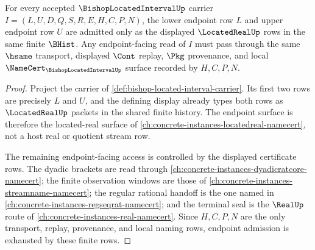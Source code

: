 \begin{theorem}
\label{thm:bishop-located-interval-endpoint-admission}
For every accepted $\BishopLocatedIntervalUp$ carrier $I=(L,U,D,Q,S,R,E,H,C,P,N)$, the lower endpoint row $L$ and upper endpoint row $U$ are admitted only as the displayed $\LocatedRealUp$ rows in the same finite $\BHist$. Any endpoint-facing read of $I$ must pass through the same $\hsame$ transport, displayed $\Cont$ replay, $\Pkg$ provenance, and local $\NameCert_{\BishopLocatedIntervalUp}$ surface recorded by $H,C,P,N$.
\end{theorem}
\begin{proof}
Project the carrier of \autoref{def:bishop-located-interval-carrier}. Its first two rows are precisely $L$ and $U$, and the defining display already types both rows as $\LocatedRealUp$ packets in the shared finite history. The endpoint surface is therefore the located-real surface of \autoref{ch:concrete-instances-locatedreal-namecert}, not a host real or quotient stream row.

The remaining endpoint-facing access is controlled by the displayed certificate rows. The dyadic brackets are read through \autoref{ch:concrete-instances-dyadicratcore-namecert}; the finite observation windows are those of \autoref{ch:concrete-instances-streamname-namecert}; the regular rational handoff is the one named in \autoref{ch:concrete-instances-regseqrat-namecert}; and the terminal seal is the $\RealUp$ route of \autoref{ch:concrete-instances-real-namecert}. Since $H,C,P,N$ are the only transport, replay, provenance, and local naming rows, endpoint admission is exhausted by these finite rows.
\end{proof}


